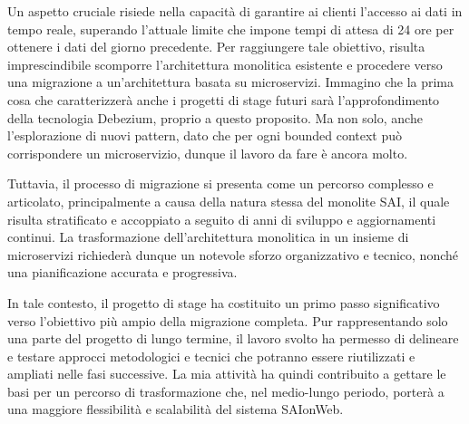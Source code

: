 Un aspetto cruciale risiede nella capacità di garantire ai clienti l’accesso ai dati in tempo reale, superando l’attuale limite che impone tempi di attesa di 24 ore per ottenere i dati del giorno precedente. Per raggiungere tale obiettivo, risulta imprescindibile scomporre l’architettura monolitica esistente e procedere verso una migrazione a un’architettura basata su microservizi.  
Immagino che la prima cosa che caratterizzerà anche i progetti di stage futuri sarà l'approfondimento della tecnologia Debezium, proprio a questo proposito. 
Ma non solo, anche l'esplorazione di nuovi pattern, dato che per ogni bounded context può corrispondere un microservizio, dunque il lavoro da fare è ancora molto. 

Tuttavia, il processo di migrazione si presenta come un percorso complesso e articolato, principalmente a causa della natura stessa del monolite SAI, il quale risulta stratificato e accoppiato a seguito di anni di sviluppo e aggiornamenti continui. La trasformazione dell’architettura monolitica in un insieme di microservizi richiederà dunque un notevole sforzo organizzativo e tecnico, nonché una pianificazione accurata e progressiva.  

In tale contesto, il progetto di stage ha costituito un primo passo significativo verso l’obiettivo più ampio della migrazione completa. Pur rappresentando solo una parte del progetto di lungo termine, il lavoro svolto ha permesso di delineare e testare approcci metodologici e tecnici che potranno essere riutilizzati e ampliati nelle fasi successive. La mia attività ha quindi contribuito a gettare le basi per un percorso di trasformazione che, nel medio-lungo periodo, porterà a una maggiore flessibilità e scalabilità del sistema SAIonWeb.
    
    
    